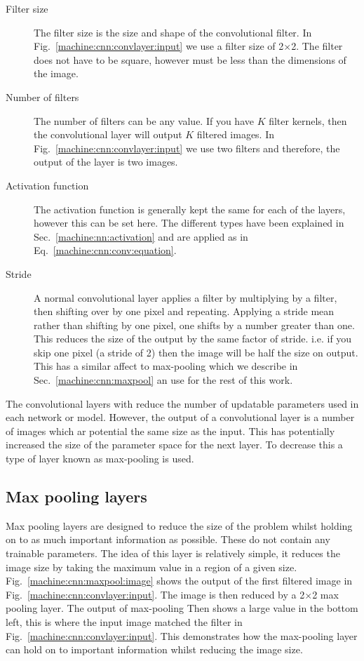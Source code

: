 \begin{description}
\item[Filter size] The filter size is the size and shape of the convolutional filter. In Fig.~\ref{machine:cnn:convlayer:input} we use a filter size of 2$\times$2. The filter does not have to be square, however must be less than the dimensions of the image.

\item[Number of filters] The number of filters can be any value. If you have $K$ filter kernels, then the convolutional layer will output $K$ filtered images. In Fig.~\ref{machine:cnn:convlayer:input} we use two filters and therefore, the output of the layer is two images.

\item[Activation function] The activation function is generally kept the same for each of the layers, however this can be set here. The different types have been explained in Sec.~\ref{machine:nn:activation} and are applied as in Eq.~\ref{machine:cnn:conv:equation}.

\item[Stride] A normal convolutional layer applies a filter by multiplying by a filter, then shifting over by one pixel and repeating. Applying a stride mean rather than shifting by one pixel, one shifts by a number greater than one. This reduces the size of the output by the same factor of stride. i.e. if you skip one pixel (a stride of 2) then the image will be half the size on output. This has a similar affect to max-pooling which we describe in Sec.~\ref{machine:cnn:maxpool} an use for the rest of this work.  
\end{description}

The convolutional layers with reduce the number of updatable parameters used in each network or model.
However, the output of a convolutional layer is a number of images which ar potential the same size as the input. 
This has potentially increased the size of the parameter space for the next layer.
To decrease this a type of layer known as max-pooling is used.

\subsection{\label{machine:cnn:maxpool}Max pooling layers}

Max pooling layers are designed to reduce the size of the problem whilst holding on to as much important information as possible.
These do not contain any trainable parameters.
The idea of this layer is relatively simple, it reduces the image size by taking the maximum value in a region of a given size.
Fig.~\ref{machine:cnn:maxpool:image} shows the output of the first filtered image in Fig.~\ref{machine:cnn:convlayer:input}.
The image is then reduced by a 2$\times$2 max pooling layer.
The output of max-pooling Then shows a large value in the bottom left, this is where the input image matched the filter in Fig.~\ref{machine:cnn:convlayer:input}.
This demonstrates how the max-pooling layer can hold on to important information whilst reducing the image size.

